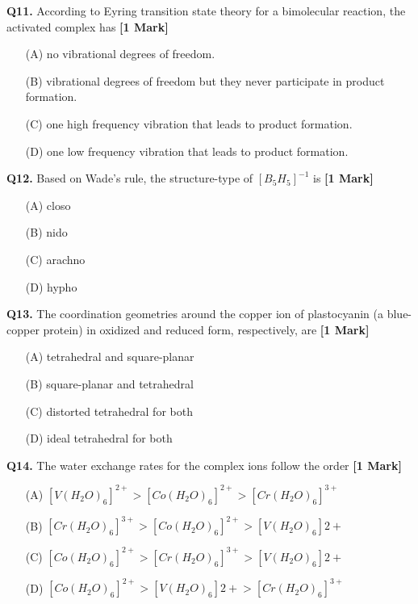 \documentclass[11pt]{article}
\newcommand{\questiona}[2]{
    \noindent\textbf{Q#2.} #1 \hfill \textbf{[1 Mark]}
}
\begin{document}
\questiona{According to Eyring transition state theory for a bimolecular reaction, the activated complex has}{11}
\begin{enumerate}
    \item[(A)] no vibrational degrees of freedom.
    \item[(B)] vibrational degrees of freedom but they never participate in product formation.
    \item[(C)] one high frequency vibration that leads to product formation.
    \item[(D)] one low frequency vibration that leads to product formation.
\end{enumerate}
\vspace{0.5cm}

\questiona{Based on Wade's rule, the structure-type of $[B_5H_5]^{-1}$ is}{12}
\begin{enumerate}
    \item[(A)] closo
    \item[(B)] nido
    \item[(C)] arachno
    \item[(D)] hypho
\end{enumerate}
\vspace{0.5cm}

\questiona{The coordination geometries around the copper ion of plastocyanin (a blue-copper protein) in oxidized and reduced form, respectively, are}{13}
\begin{enumerate}
    \item[(A)] tetrahedral and square-planar
    \item[(B)] square-planar and tetrahedral
    \item[(C)] distorted tetrahedral for both
    \item[(D)] ideal tetrahedral for both
\end{enumerate}
\vspace{0.5cm}

\questiona{The water exchange rates for the complex ions follow the order}{14}
\begin{enumerate}
    \item[(A)] $[V(H_2O)_6]^{2+} > [Co(H_2O)_6]^{2+} > [Cr(H_2O)_6]^{3+}$
    \item[(B)] $[Cr(H_2O)_6]^{3+} > [Co(H_2O)_6]^{2+} > [V(H_2O)_6]{2+}$
    \item[(C)] $[Co(H_2O)_6]^{2+} > [Cr(H_2O)_6]^{3+} > [V(H_2O)_6]{2+}$
    \item[(D)] $[Co(H_2O)_6]^{2+} > [V(H_2O)_6]{2+} > [Cr(H_2O)_6]^{3+}$
\end{enumerate}
\vspace{0.5cm}
\end{document}
